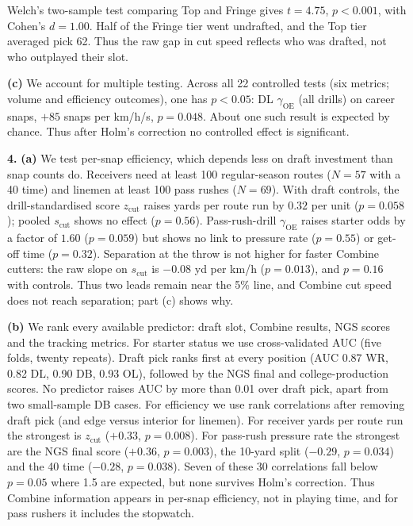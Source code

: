 \documentclass[11pt]{article}
\begin{document}
Welch's two-sample test comparing Top and Fringe gives $t = 4.75$, $p < 0.001$, with Cohen's $d = 1.00$. Half of the Fringe tier went undrafted, and the Top tier averaged pick 62. Thus the raw gap in cut speed reflects who was drafted, not who outplayed their slot.

\noindent\textbf{(c)}
We account for multiple testing. Across all 22 controlled tests (six metrics; volume and efficiency outcomes), one has $p < 0.05$: DL $\gamma_{\text{OE}}$ (all drills) on career snaps, $+85$ snaps per km/h/s, $p = 0.048$. About one such result is expected by chance. Thus after Holm's correction no controlled effect is significant.

\noindent\textbf{4.}
\noindent\textbf{(a)}
We test per-snap efficiency, which depends less on draft investment than snap counts do. Receivers need at least 100 regular-season routes ($N = 57$ with a 40 time) and linemen at least 100 pass rushes ($N = 69$). With draft controls, the drill-standardised score $z_{\text{cut}}$ raises yards per route run by $0.32$ per unit ($p = 0.058$); pooled $s_{\text{cut}}$ shows no effect ($p = 0.56$). Pass-rush-drill $\gamma_{\text{OE}}$ raises starter odds by a factor of $1.60$ ($p = 0.059$) but shows no link to pressure rate ($p = 0.55$) or get-off time ($p = 0.32$). Separation at the throw is not higher for faster Combine cutters: the raw slope on $s_{\text{cut}}$ is $-0.08$ yd per km/h ($p = 0.013$), and $p = 0.16$ with controls. Thus two leads remain near the 5\% line, and Combine cut speed does not reach separation; part (c) shows why.

\noindent\textbf{(b)}
We rank every available predictor: draft slot, Combine results, NGS scores and the tracking metrics. For starter status we use cross-validated AUC (five folds, twenty repeats). Draft pick ranks first at every position (AUC 0.87 WR, 0.82 DL, 0.90 DB, 0.93 OL), followed by the NGS final and college-production scores. No predictor raises AUC by more than 0.01 over draft pick, apart from two small-sample DB cases. For efficiency we use rank correlations after removing draft pick (and edge versus interior for linemen). For receiver yards per route run the strongest is $z_{\text{cut}}$ ($+0.33$, $p = 0.008$). For pass-rush pressure rate the strongest are the NGS final score ($+0.36$, $p = 0.003$), the 10-yard split ($-0.29$, $p = 0.034$) and the 40 time ($-0.28$, $p = 0.038$). Seven of these 30 correlations fall below $p = 0.05$ where 1.5 are expected, but none survives Holm's correction. Thus Combine information appears in per-snap efficiency, not in playing time, and for pass rushers it includes the stopwatch.
\end{document}
